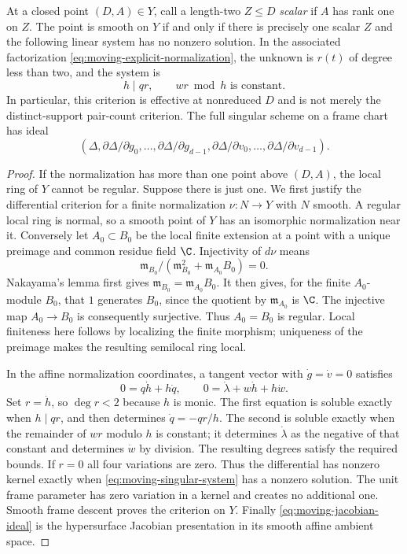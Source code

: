 \begin{proposition}
\label{prop:moving-singular-test}
At a closed point $(D,A)\in Y$, call a length-two $Z\le D$
\emph{scalar} if $A$ has rank one on $Z$. The point is smooth on
$Y$ if and only if there is precisely one scalar $Z$ and the
following linear system has no nonzero solution. In the associated
factorization \eqref{eq:moving-explicit-normalization}, the unknown
is $r(t)$ of degree less than two, and the system is
\begin{equation}\label{eq:moving-singular-system}
                 h\mid qr,\qquad wr\bmod h\text{ is constant}.
\end{equation}
In particular, this criterion is effective at nonreduced $D$ and
is not merely the distinct-support pair-count criterion. The full
singular scheme on a frame chart has ideal
\begin{equation}\label{eq:moving-jacobian-ideal}
 (\Delta,\partial\Delta/\partial g_0,\ldots,
          \partial\Delta/\partial g_{d-1},
          \partial\Delta/\partial v_0,\ldots,
          \partial\Delta/\partial v_{d-1}).
\end{equation}
\end{proposition}
\begin{proof}
If the normalization has more than one point above $(D,A)$, the
local ring of $Y$ cannot be regular. Suppose there is just one.
We first justify the differential criterion for a finite
normalization $\nu:N\to Y$ with $N$ smooth. A regular local ring
is normal, so a smooth point of $Y$ has an isomorphic normalization
near it. Conversely let $A_0\subset B_0$ be the local finite
extension at a point with a unique preimage and common residue
field $\C$. Injectivity of $d\nu$ means
\[
 \mathfrak m_{B_0}/(\mathfrak m_{B_0}^2+
                         \mathfrak m_{A_0}B_0)=0.
\]
Nakayama's lemma first gives
$\mathfrak m_{B_0}=\mathfrak m_{A_0}B_0$. It then gives, for the
finite $A_0$-module $B_0$, that $1$ generates $B_0$, since the
quotient by $\mathfrak m_{A_0}$ is $\C$. The injective map
$A_0\to B_0$ is consequently surjective. Thus $A_0=B_0$ is regular.
Local finiteness here follows by localizing the finite morphism;
uniqueness of the preimage makes the resulting semilocal ring local.

In the affine normalization coordinates, a tangent vector with
$\dot g=\dot v=0$ satisfies
\[
 0=q\dot h+h\dot q,\qquad
 0=\dot\lambda+w\dot h+h\dot w.
\]
Set $r=\dot h$, so $\deg r<2$ because $h$ is monic. The first
equation is soluble exactly when $h\mid qr$, and then determines
$\dot q=-qr/h$. The second is soluble exactly when the remainder
of $wr$ modulo $h$ is constant; it determines $\dot\lambda$ as
the negative of that constant and determines $\dot w$ by division.
The resulting degrees satisfy the required bounds. If $r=0$ all
four variations are zero. Thus the differential has nonzero kernel
exactly when \eqref{eq:moving-singular-system} has a nonzero solution.
The unit frame parameter has zero variation in a kernel and creates
no additional one. Smooth frame descent proves the criterion on
$Y$. Finally \eqref{eq:moving-jacobian-ideal} is the hypersurface
Jacobian presentation in its smooth affine ambient space.
\end{proof}


